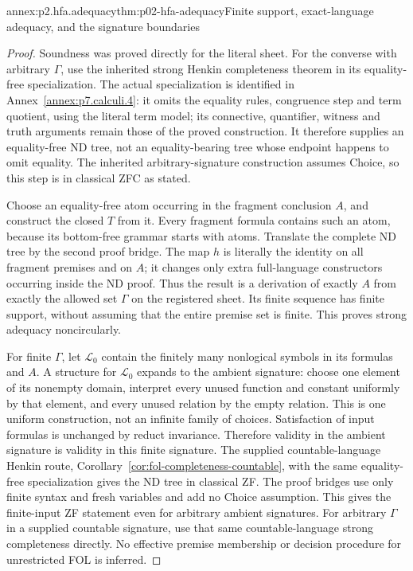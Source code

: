 \begin{annexitem}{annex:p2.hfa.adequacy}{thm:p02-hfa-adequacy}{Finite support, exact-language adequacy, and the signature boundaries}
\begin{proof}
Soundness was proved directly for the literal sheet. For the converse
with arbitrary \(\Gamma\), use the inherited strong Henkin completeness
theorem in its equality-free specialization. The actual specialization
is identified in Annex~\ref{annex:p7.calculi.4}: it omits the equality
rules, congruence step and term quotient, using the literal term model;
its connective, quantifier, witness and truth arguments remain those
of the proved construction. It therefore supplies an equality-free
ND tree, not an equality-bearing tree whose endpoint happens to omit
equality. The inherited arbitrary-signature construction assumes Choice,
so this step is in classical ZFC as stated.

Choose an equality-free atom occurring in the fragment conclusion
\(A\), and construct the closed \(T\) from it. Every fragment
formula contains such an atom, because its bottom-free grammar starts
with atoms. Translate the complete ND tree by the second proof bridge.
The map \(h\) is literally the identity on all fragment premises and
on \(A\); it changes only extra full-language constructors occurring
inside the ND proof. Thus the result is a derivation of exactly \(A\)
from exactly the allowed set \(\Gamma\) on the registered sheet.
Its finite sequence has finite support, without assuming that the
entire premise set is finite. This proves strong adequacy noncircularly.

For finite \(\Gamma\), let \(\mathcal L_0\) contain the finitely
many nonlogical symbols in its formulas and \(A\). A structure for
\(\mathcal L_0\) expands to the ambient signature: choose one
element of its nonempty domain, interpret every unused function and
constant uniformly by that element, and every unused relation by the
empty relation. This is one uniform construction, not an infinite
family of choices. Satisfaction of input formulas is unchanged by
reduct invariance. Therefore validity in the ambient signature is
validity in this finite signature. The supplied countable-language
Henkin route, Corollary~\ref{cor:fol-completeness-countable}, with the
same equality-free specialization gives the ND tree in classical ZF.
The proof bridges use only finite syntax and fresh variables and add
no Choice assumption. This gives the finite-input ZF statement even
for arbitrary ambient signatures. For arbitrary \(\Gamma\) in
a supplied countable signature, use that same countable-language
strong completeness directly. No effective premise membership or
decision procedure for unrestricted FOL is inferred.


\end{proof}
\end{annexitem}
